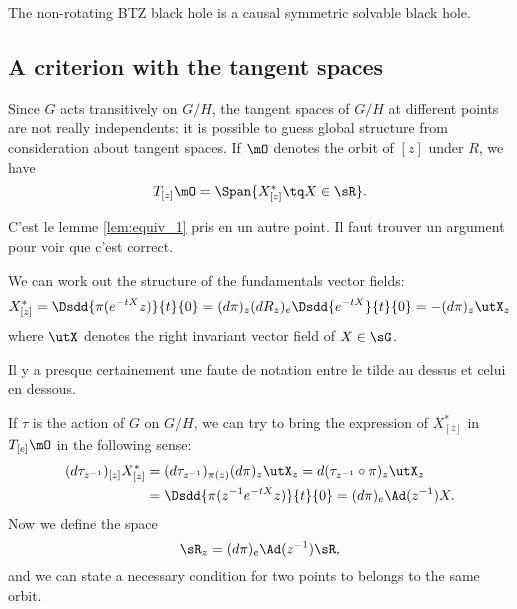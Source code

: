 \begin{corollary}
    The non-rotating BTZ black hole is a causal symmetric solvable black hole.
\end{corollary}

\subsection{A criterion with the tangent spaces}\label{subsec:R_z}

Since $G$ acts transitively on $G/H$, the tangent spaces of $G/H$ at different points are not really independents: it is possible to guess global structure from consideration about tangent spaces. If $\mO$ denotes the orbit of $[z]$ under $R$, we have
\[
   T_{[z]}\mO=\Span\{X^*_{[z]}\tq X\in\sR\}.
\]
\begin{probleme}
C'est le lemme \ref{lem:equiv_1} pris en un autre point. Il faut trouver un argument pour voir que c'est correct.
\end{probleme}

We can work out the structure of the fundamentals vector fields:
 \begin{equation}
  X^*_{[z]}=\Dsdd{ \pi(e^{-tX}z) }{t}{0}
	   =(d\pi)_z(dR_z)_e\Dsdd{e^{-tX}}{t}{0}
	   =-(d\pi)_z\utX_z
\end{equation}
where $\utX$ denotes the right invariant vector field of $X\in\sG$. 

\begin{probleme}
Il y a presque certainement une faute de notation entre le tilde au dessus et celui en dessous.
\end{probleme}

If $\tau$ is the action of $G$ on $G/H$, we can try to bring the expression of $X^*_{[z]}$ in $T_{[e]}\mO$ in the following sense:
\begin{equation}
\begin{split}
(d\tau_{z^{-1}})_{[z]}X^*_{[z]}&=(d\tau_{z^{-1}})_{\pi(z)}(d\pi)_z\utX_z
                              =d(\tau_{z^{-1}}\circ \pi)_z\utX_z\\
			      &=\Dsdd{ \pi( z^{-1} e^{-tX}z ) }{t}{0}
			      =(d\pi)_e\Ad(z^{-1})X.
\end{split}
\end{equation}
Now we define the space
\begin{equation}
\sR_z=(d\pi)_e\Ad(z^{-1})\sR,
\end{equation}
and we can state a necessary condition for two points to belongs to the same orbit.

